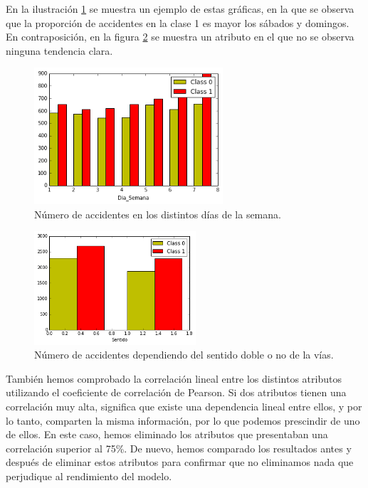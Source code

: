\documentclass[journal,twoside]{JoPhA}
\begin{document}
En la ilustración \ref{fig:graf_tendencia} se muestra un ejemplo de estas gráficas, en la que se observa que la proporción de accidentes en la clase 1 es mayor los sábados y domingos. En contraposición, en la figura \ref{fig:graf_no_tendencia} se muestra un atributo en el que no se observa ninguna tendencia clara.

\begin{figure}[htb!]
	\begin{center}
		\includegraphics[width=7cm]{figs/dia_semana.png}
		\caption{Número de accidentes en los distintos días de la semana.}
		\label{fig:graf_tendencia}
	\end{center}
\end{figure}

\begin{figure}[htb!]
	\begin{center}
		\includegraphics[width=6cm]{figs/hora.png}
		\caption{Número de accidentes dependiendo del sentido doble o no de la vías.}
		\label{fig:graf_no_tendencia}
	\end{center}
\end{figure}

También hemos comprobado la correlación lineal entre los distintos atributos utilizando el coeficiente de correlación de Pearson. Si dos atributos tienen una correlación muy alta, significa que existe una dependencia lineal entre ellos, y por lo tanto, comparten la misma información, por lo que podemos prescindir de uno de ellos. En este caso, hemos eliminado los atributos que presentaban una correlación superior al 75\%. De nuevo, hemos comparado los resultados antes y después de eliminar estos atributos para confirmar que no eliminamos nada que perjudique al rendimiento del modelo. \\
\end{document}
